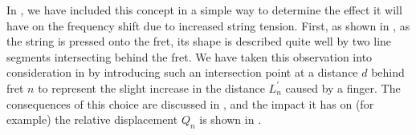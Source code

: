 
In , we have included this concept in a simple way to determine the effect it will have on the frequency shift due to increased string tension. First, as shown in , as the string is pressed onto the fret, its shape is described quite well by two line segments intersecting behind the fret. We have taken this observation into consideration in  by introducing such an intersection point at a distance $d$ behind fret $n$ to represent the slight increase in the distance $L_n^\prime$ caused by a finger. The consequences of this choice are discussed in , and the impact it has on (for example) the relative displacement $Q_n$ is shown in .



